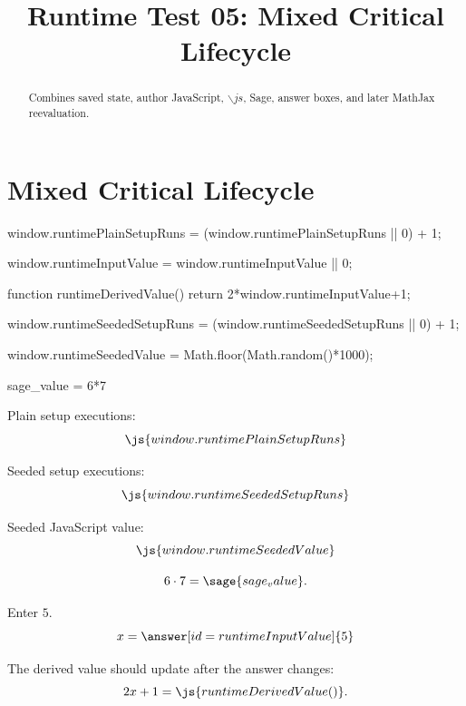 \documentclass{ximera}
\title{Runtime Test 05: Mixed Critical Lifecycle}
\begin{document}
\begin{abstract}
Combines saved state, author JavaScript, \(\backslash js\), Sage, answer boxes,
and later MathJax reevaluation.
\end{abstract}
\maketitle

\section{Mixed Critical Lifecycle}


\begin{javascript}
window.runtimePlainSetupRuns =
  (window.runtimePlainSetupRuns || 0) + 1;

window.runtimeInputValue =
  window.runtimeInputValue || 0;

function runtimeDerivedValue() {
  return 2*window.runtimeInputValue+1;
}

window.runtimeSeededSetupRuns =
  (window.runtimeSeededSetupRuns || 0) + 1;

window.runtimeSeededValue =
  Math.floor(Math.random()*1000);
\end{javascript}

\begin{sagesilent}
sage_value = 6*7
\end{sagesilent}

Plain setup executions:
\[
\js{window.runtimePlainSetupRuns}
\]

Seeded setup executions:
\[
\js{window.runtimeSeededSetupRuns}
\]

Seeded JavaScript value:
\[
\js{window.runtimeSeededValue}
\]

\[
6\cdot7=\sage{sage_value}.
\]

\begin{problem}
Enter \(5\).
\[
x=\answer[id=runtimeInputValue]{5}
\]
\end{problem}

The derived value should update after the answer changes:
\[
2x+1=\js{runtimeDerivedValue()}.
\]
\end{document}
